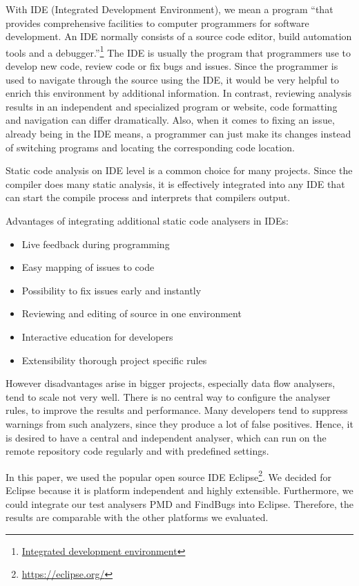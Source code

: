 \documentclass[conference]{IEEEtran}
\begin{document}
With IDE (Integrated Development Environment), we mean a program ``that provides comprehensive facilities to computer programmers for software development. An IDE normally consists of a source code editor, build automation tools and a debugger.''\footnote{\href{http://en.wikipedia.org/wiki/Integrated_development_environment}{Integrated development environment}}
The IDE is usually the program that programmers use to develop new code, review code or fix bugs and issues. Since the programmer is used to navigate through the source using the IDE, it would be very helpful to enrich this environment by additional information. In contrast, reviewing analysis results in an independent and specialized program or website, code formatting and navigation can differ dramatically. Also, when it comes to fixing an issue, already being in the IDE means, a programmer can just make its changes instead of switching programs and locating the corresponding code location.

Static code analysis on IDE level is a common choice for many projects. Since the compiler does many static analysis, it is effectively integrated into any IDE that can start the compile process and interprets that compilers output.

Advantages of integrating additional static code analysers in IDEs:
\begin{itemize}
	\item Live feedback during programming
	\item Easy mapping of issues to code
	\item Possibility to fix issues early and instantly
	\item Reviewing and editing of source in one environment
	\item Interactive education for developers
	\item Extensibility thorough project specific rules
\end{itemize}

However disadvantages arise in bigger projects, especially data flow analysers, tend to scale not very well. 
There is no central way to configure the analyser rules, to improve the results and performance.
Many developers tend to suppress warnings from such analyzers, since they produce a lot of false positives.
Hence, it is desired to have a central and independent analyser, which can run on the remote repository code regularly and with predefined settings.

In this paper, we used the popular open source IDE Eclipse\footnote{\href{https://eclipse.org/}{https://eclipse.org/}}.
We decided for Eclipse because it is platform independent and highly extensible. Furthermore, we could integrate our test analysers PMD and FindBugs into Eclipse. Therefore, the results are comparable with the other platforms we evaluated.
\end{document}
